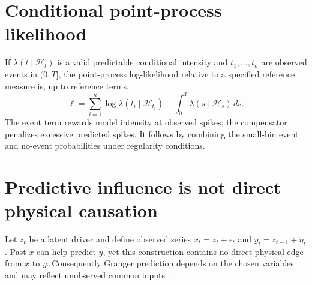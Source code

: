 \section{Conditional point-process likelihood}
If $\lambda(t\mid\mathcal H_t)$ is a valid predictable
conditional intensity and $t_1,\ldots,t_n$ are observed events
in $(0,T]$, the point-process log-likelihood relative to a
specified reference measure is, up to reference terms,
\[
\ell=\sum_{i=1}^n\log\lambda(t_i\mid\mathcal H_{t_i})
-\int_0^T\lambda(s\mid\mathcal H_s)\,ds.
\]
The event term rewards model intensity at observed spikes;
the compensator penalizes excessive predicted spikes.
It follows by combining the small-bin event and no-event
probabilities under regularity conditions.

\section{Predictive influence is not direct physical causation}
Let $z_t$ be a latent driver and define observed series
$x_t=z_t+\epsilon_t$ and $y_t=z_{t-1}+\eta_t$.
Past $x$ can help predict $y$, yet this construction contains
no direct physical edge from $x$ to $y$.
Consequently Granger prediction depends on the chosen
variables and may reflect unobserved common inputs
\cite{bastos2016,cekic2018}.
